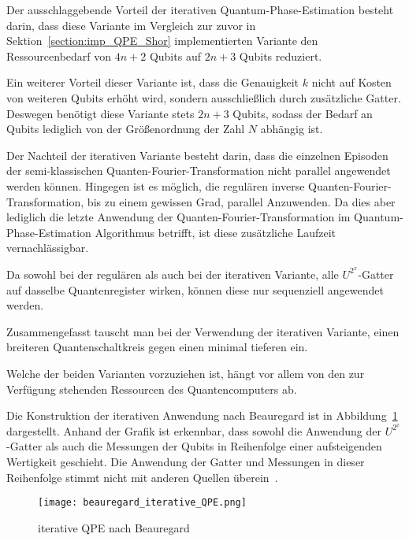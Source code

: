 Der ausschlaggebende Vorteil der iterativen Quantum-Phase-Estimation besteht darin, 
dass diese Variante im Vergleich zur zuvor in Sektion~\ref{section:imp_QPE_Shor} implementierten Variante den Ressourcenbedarf von \(4n+2\) Qubits auf \(2n+3\) Qubits reduziert.

Ein weiterer Vorteil dieser Variante ist, 
dass die Genauigkeit \(k\) nicht auf Kosten von weiteren Qubits erhöht wird, 
sondern ausschließlich durch zusätzliche Gatter.
Deswegen benötigt diese Variante stets \(2n+3\) Qubits, 
sodass der Bedarf an Qubits lediglich von der Größenordnung der Zahl \(N\) abhängig ist.

Der Nachteil der iterativen Variante besteht darin, 
dass die einzelnen Episoden der semi-klassischen Quanten-Fourier-Transformation nicht parallel angewendet werden können.
Hingegen ist es möglich, die regulären inverse Quanten-Fourier-Transformation, bis zu einem gewissen Grad, 
parallel Anzuwenden.
Da dies aber lediglich die letzte Anwendung der Quanten-Fourier-Transformation im Quantum-Phase-Estimation Algorithmus betrifft, 
ist diese zusätzliche Laufzeit vernachlässigbar.

Da sowohl bei der regulären als auch bei der iterativen Variante, 
alle \(U^{2^x}\)-Gatter auf dasselbe Quantenregister wirken, 
können diese nur sequenziell angewendet werden.

Zusammengefasst tauscht man bei der Verwendung der iterativen Variante, 
einen breiteren Quantenschaltkreis gegen einen minimal tieferen ein.

Welche der beiden Varianten vorzuziehen ist, 
hängt vor allem von den zur Verfügung stehenden Ressourcen des Quantencomputers ab.

\bigskip

Die Konstruktion der iterativen Anwendung nach Beauregard ist in Abbildung~\ref{fig:iterative_iQPE_Beauregard} dargestellt.
Anhand der Grafik ist erkennbar, 
dass sowohl die Anwendung der \(U^{2^x}\)-Gatter als auch die Messungen der Qubits in Reihenfolge einer aufsteigenden Wertigkeit geschieht.
Die Anwendung der Gatter und Messungen in dieser Reihenfolge stimmt nicht mit anderen Quellen überein~\cite{Parker2000}.

\begin{figure}[H]
  \centering
  \texttt{[image: beauregard\_iterative\_QPE.png]}
  \caption{iterative QPE nach Beauregard~\cite{beauregard2003circuit}}
  \label{fig:iterative_iQPE_Beauregard}
\end{figure}

